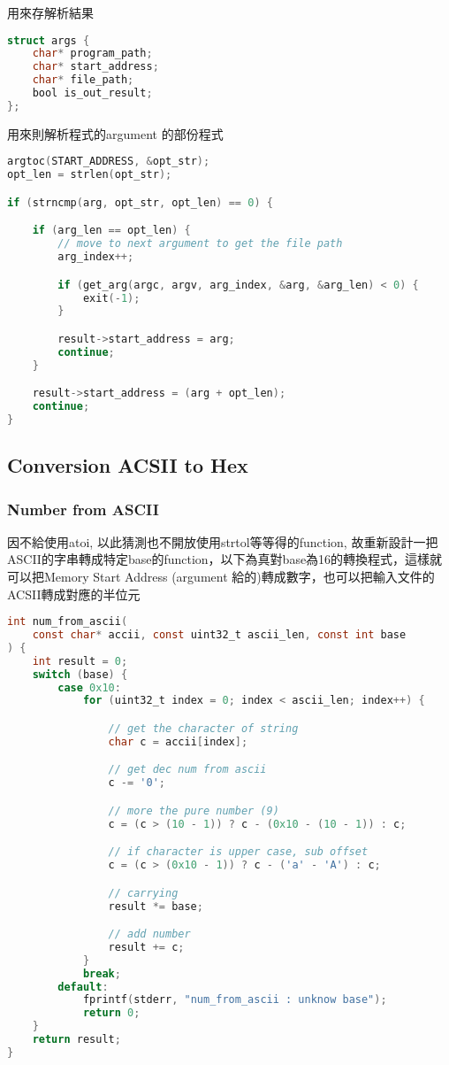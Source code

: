 \documentclass[UTF8,12pt]{article} %
\begin{document}
用來存解析結果
\begin{lstlisting}[language={C}]
struct args {
	char* program_path;
	char* start_address;
	char* file_path;
	bool is_out_result;
};
\end{lstlisting}
\newpage
用來則解析程式的argument 的部份程式

\begin{lstlisting}[language={C}]
argtoc(START_ADDRESS, &opt_str);
opt_len = strlen(opt_str);

if (strncmp(arg, opt_str, opt_len) == 0) {

	if (arg_len == opt_len) {
		// move to next argument to get the file path
		arg_index++;

		if (get_arg(argc, argv, arg_index, &arg, &arg_len) < 0) {
			exit(-1);
		}

		result->start_address = arg;
		continue;
	}

	result->start_address = (arg + opt_len);
	continue;
}
\end{lstlisting}
\newpage



\subsection{Conversion ACSII to Hex}
\subsubsection{Number from ASCII}
因不給使用atoi, 以此猜測也不開放使用strtol等等得的function, 故重新設計一把ASCII的字串轉成特定base的function，以下為真對base為16的轉換程式，這樣就可以把Memory Start Address (argument 給的)轉成數字，也可以把輸入文件的ACSII轉成對應的半位元
\begin{lstlisting}[language={C}]
int num_from_ascii(
	const char* accii, const uint32_t ascii_len, const int base
) {
	int result = 0;
	switch (base) {
		case 0x10:
			for (uint32_t index = 0; index < ascii_len; index++) {

				// get the character of string
				char c = accii[index];

				// get dec num from ascii
				c -= '0';

				// more the pure number (9)
				c = (c > (10 - 1)) ? c - (0x10 - (10 - 1)) : c;

				// if character is upper case, sub offset
				c = (c > (0x10 - 1)) ? c - ('a' - 'A') : c;

				// carrying
				result *= base;

				// add number
				result += c;
			}
			break;
		default:
			fprintf(stderr, "num_from_ascii : unknow base");
			return 0;
	}
	return result;
}
\end{lstlisting}
\end{document}
